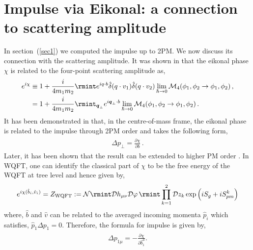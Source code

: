 \section{Impulse via Eikonal: a connection to scattering amplitude}\label{ch2:app:B}
In section~(\ref{sec1}) we computed the impulse up to 2PM. We now discuss its connection with the scattering amplitude. It was shown in \cite{Amati:1987wq, Amati:1990xe} that the eikonal phase $\chi$ is related to the four-point scattering amplitude as,
\begin{align}
    \begin{split}
e^{i\chi}&\equiv 1+\frac{i}{4m_1 m_2}\rmint e^{iq\cdot b}\hat\delta(q\cdot v_1)\hat\delta(q\cdot v_2)\lim_{\hbar\rightarrow 0}\mathcal{M}_4(\phi_1,\phi_2\rightarrow \phi_1,\phi_2)\,,\\ &
=1+\frac{i}{4m_1 m_2}\rmint_{\boldsymbol{q}_{\perp}}e^{i \boldsymbol{q}_{\perp}\cdot b}\lim_{\hbar\rightarrow 0}\mathcal{M}_4(\phi_1,\phi_2\rightarrow \phi_1,\phi_2)\,.
    \end{split}
\end{align}
It has been demonstrated in \cite{Bern:2020buy,Bjerrum-Bohr:2018xdl} that, in the centre-of-mass frame, the eikonal phase is related to the impulse through 2PM order and takes the following form,
\begin{align}
    \begin{split}
        \Delta p_{\perp}= \frac{\partial \chi}{\partial b}\,.
    \end{split}
\end{align}
Later, it has been shown that the result can be extended to higher PM order \cite{Maybee:2019jus,Bern:2020buy}. In WQFT, one can identify the classical part of $\chi$ to be the free energy of the WQFT at tree level and hence given by,
\begin{align}
    \begin{split}
    e^{i\chi(\hat b_i,\hat v_i)}= Z_{\textrm{WQFT}}:=\mathcal{N}\rmint \mathcal{D}h_{\mu\nu}\mathcal{D}\varphi\,\rmint\prod_{k=1}^2\mathcal{D}z_{k}\exp\Big(iS_{g}+iS^k_{pm}\Big)
    \end{split}
\end{align}
where, $\hat b$ and $\hat v$ can be related to the averaged incoming momenta $\hat p_i$ which satisfies, $\hat p_1\Delta p_1=0$. Therefore, the formula for impulse is given by,
\begin{align}
    \begin{split}
        \Delta p_{1\mu}=-\frac{\partial \chi}{\partial \hat b_1^\mu}.
    \end{split}
\end{align}
